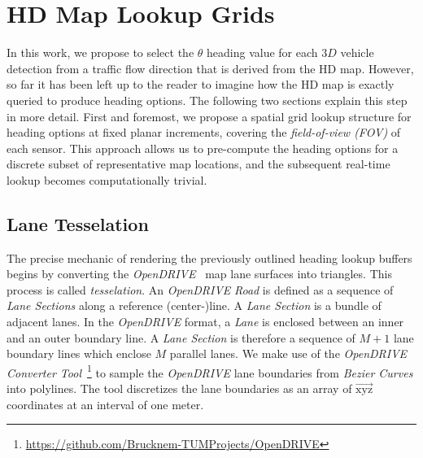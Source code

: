 
\section{HD Map Lookup Grids}
\label{sec:hdmapgrids}

In this work, we propose to select the $\theta$ heading value for each $3D$ vehicle detection from a traffic flow direction that is derived from the HD map.
However, so far it has been left up to the reader to imagine how the HD map is exactly queried to produce heading options.
The following two sections explain this step in more detail.
First and foremost, we propose a spatial grid lookup structure for heading options at fixed planar increments, covering the \textit{field-of-view (FOV)} of each sensor.
This approach allows us to pre-compute the heading options for a discrete subset of representative map locations, and the subsequent real-time lookup becomes computationally trivial.

\subsection{Lane Tesselation}
\label{subsec:tesselation}

The precise mechanic of rendering the previously outlined heading lookup buffers begins by converting the \textit{OpenDRIVE}~\cite{dupuis2010opendrive} map lane surfaces into triangles.
This process is called \textit{tesselation}.
An \textit{OpenDRIVE} \textit{Road} is defined as a sequence of \textit{Lane Sections} along a reference (center-)line.
A \textit{Lane Section} is a bundle of adjacent lanes.
In the \textit{OpenDRIVE} format, a \textit{Lane} is enclosed between an inner and an outer boundary line.
A \textit{Lane Section} is therefore a sequence of $M+1$ lane boundary lines which enclose $M$ parallel lanes.
We make use of the \textit{OpenDRIVE Converter Tool}~\footnote{\hyperlink{https://github.com/Brucknem-TUMProjects/OpenDRIVE}{https://github.com/Brucknem-TUMProjects/OpenDRIVE}} to sample the \textit{OpenDRIVE} lane boundaries from \textit{Bezier Curves} into polylines.
The tool discretizes the lane boundaries as an array of $\overrightarrow{\text{xyz}}$ coordinates at an interval of one meter.

